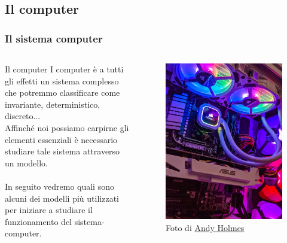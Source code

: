 \subsection[Il computer]{Il computer}
\begin{frame}
	\frametitle{Il sistema computer}
	
	\begin{columns}			
		\begin{block}{Il computer}
			I computer è a tutti gli effetti un sistema complesso che potremmo classificare come invariante, deterministico, discreto...\\
			Affinché noi possiamo carpirne gli elementi essenziali è necessario studiare tale sistema attraverso un modello.\\~\\
			In seguito vedremo quali sono alcuni dei modelli più utilizzati per iniziare a studiare il funzionamento del sistema-computer.			
		\end{block}
		
		\begin{figure}[!htbp]
			\centering 
			\includegraphics[width=0.95\linewidth]{images/1_i_sistemi/computer.jpeg}
			\caption{Foto di \href{https://unsplash.com/it/@andyjh07}{Andy Holmes}}
		\end{figure}		
	\end{columns}
	
	
\end{frame}
